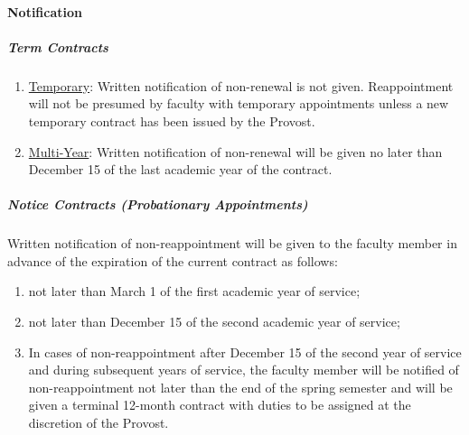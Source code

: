 			\paragraph{Notification}
				\label{sec:NonReappointment-Notification}
				\subparagraph{Term Contracts}
					\begin{enumerate}[label=\alph*)]
						\item{\underline{Temporary}: Written notification of non-renewal is not given.  Reappointment will not be presumed by faculty with temporary appointments unless a new temporary contract has been issued by the Provost.}
						\item{\underline{Multi-Year}: Written notification of non-renewal will be given no later than December 15 of the last academic year of the contract.}
					\end{enumerate}
				\subparagraph{Notice Contracts (Probationary Appointments)}
					Written notification of non-reappointment will be given to the faculty member in advance of the expiration of the current contract as follows:
					\begin{enumerate}[label=\alph*)]
						\item{not later than March 1 of the first academic year of service;}
						\item{not later than December 15 of the second academic year of service;}
						\item{In cases of non-reappointment after December 15 of the second year of service and during subsequent years of service, the faculty member will be notified of non-reappointment not later than the end of the spring semester and will be given a terminal 12-month contract with duties to be assigned at the discretion of the Provost.}
					\end{enumerate}
